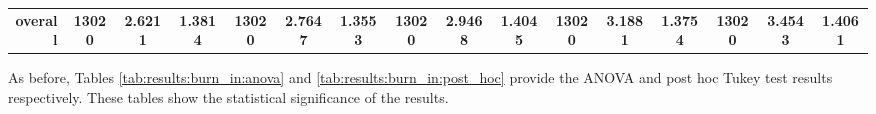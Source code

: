 \begin{table}[htbp]
{\begin{tabular}{rccccccccccccccc}
			\midrule
			\textbf{overall}                    & \textbf{13020}                        & \cellcolor[rgb]{ .776,  .937,  .808}\textcolor[rgb]{ 0,  .38,  0}{\textbf{2.6211}} & \textbf{1.3814} & \textbf{13020} & \textbf{2.7647}                                                           & \textbf{1.3553} & \textbf{13020} & \textbf{2.9468}                                                           & \textbf{1.4045} & \textbf{13020} & \textbf{3.1881}                                                           & \textbf{1.3754} & \textbf{13020} & \textbf{3.4543} & \textbf{1.4061} \\
		\end{tabular}%
	}
\end{table}%


As before, Tables \ref{tab:results:burn_in:anova} and \ref{tab:results:burn_in:post_hoc} provide the ANOVA and post hoc Tukey test results respectively. These tables show the statistical significance of the results.

\begin{table}[htbp]
	\centering
	\caption{ANOVA - Rank - BHH Variant: Burn In}
	\label{tab:results:burn_in:anova}%
	\par\bigskip
\end{table}



